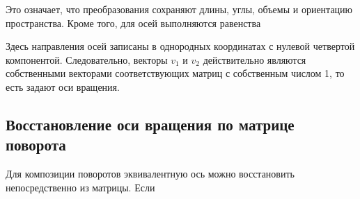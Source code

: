 \documentclass[a4paper,14pt]{extarticle}
\begin{document}
\begin{center}\end{center}

Это означает, что преобразования сохраняют длины, углы, объемы и ориентацию пространства. Кроме того, для осей выполняются равенства

\begin{center}\end{center}

Здесь направления осей записаны в однородных координатах с нулевой четвертой компонентой. Следовательно, векторы $v_1$ и $v_2$ действительно являются собственными векторами соответствующих матриц с собственным числом 1, то есть задают оси вращения.

\subsection*{Восстановление оси вращения по матрице поворота}

Для композиции поворотов эквивалентную ось можно восстановить непосредственно из матрицы. Если

\begin{center}\end{center}
\end{document}
